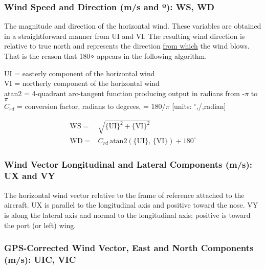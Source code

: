 \documentclass[
  english,
]{book}
\begin{document}
\hypertarget{ws-wd}{%
\subsubsection*{\texorpdfstring{Wind Speed and Direction (m/s and {º}): WS, WD}{Wind Speed and Direction (m/s and º): WS, WD}}\label{ws-wd}}

The magnitude and direction of the horizontal wind. These variables are obtained in a straightforward manner from UI and VI. The resulting wind direction is relative to true north and represents the direction \underline{from which} the wind blows. That is the reason that 180{∘} appears in the following algorithm.

UI = easterly component of the horizontal wind\\
VI = northerly component of the horizontal wind\\
atan2 = 4-quadrant arc-tangent function producing output in radians
from -\(\pi\) to \(\pi\)\\
\(C_{rd}\) = conversion factor, radians to degrees, = 180/\(\pi\) {[}units: \(^{\circ}\),/,radian{]}

\begin{align}
\mathrm{WS} = & \sqrt{\mathrm{\{UI\}}^{2}+\{\mathrm{VI\}}^{2}}\label{eq:WS}\\
\mathrm{WD} = & C_{rd}\mathrm{\,atan2(\{UI\},\,\{VI\})}+180^{\circ}  
\label{eq:WD}
\end{align}

\hypertarget{ux-vy}{%
\subsubsection*{Wind Vector Longitudinal and Lateral Components (m/s): UX and VY}\label{ux-vy}}

The horizontal wind vector relative to the frame of reference attached to the aircraft. UX is parallel to the longitudinal axis and positive toward the nose. VY is along the lateral axis and normal to the longitudinal axis; positive is toward the port (or left) wing.

\hypertarget{uic-vic}{%
\subsubsection*{GPS-Corrected Wind Vector, East and North Components (m/s): UIC, VIC}\label{uic-vic}}
\end{document}
